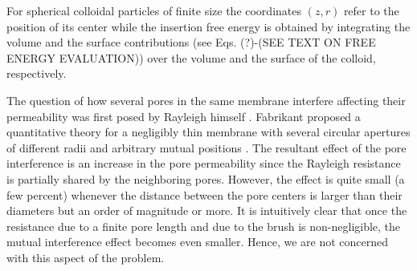 \documentclass[12pt, a4paper]{article}
\begin{document}
For spherical colloidal particles of finite size the coordinates $(z,r)$ refer to the position of its center while the insertion free energy is obtained by integrating the volume and the surface contributions (see Eqs. (?)-(SEE TEXT ON FREE ENERGY EVALUATION))  over the volume and the surface of the colloid, respectively.

The question of how several pores in the same membrane interfere affecting their permeability was first posed by Rayleigh himself \cite{Strutt1878}. Fabrikant  proposed a quantitative theory for a negligibly thin membrane with several circular apertures of different radii and arbitrary mutual positions \cite{Fabrikant1985}. The resultant effect of the pore interference is an increase in the pore permeability since the Rayleigh resistance is partially shared by the neighboring pores. However, the effect is quite small (a few percent) whenever the distance between the pore centers is larger than their diameters but an order of magnitude or more. It is intuitively clear that once the resistance due to a finite pore length and due to the brush is non-negligible, the mutual interference effect becomes even smaller. Hence, we are not concerned with this aspect of the problem.

\medskip

\printbibliography
\end{document}
